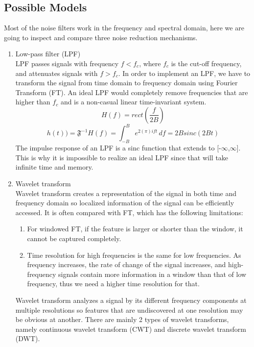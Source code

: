 \subsection{Possible Models}
Most of the noise filters work in the frequency and spectral domain, here we are going to inspect and
compare three noise reduction mechanisms.

\begin{enumerate}[label=\textbf{\arabic*})]
    \item Low-pass filter (LPF)\\
    LPF passes signals with frequency \(f<f_{c}\), where \(f_{c}\) is the cut-off frequency, and attenuates
    signals with \(f>f_{c}\). 
    In order to implement an LPF, we have to transform the signal from time domain to 
    frequency domain using Fourier Transform (FT). An ideal LPF would completely remove frequencies that are
    higher than \(f_{c}\) and is a non-casual linear time-invariant system. 
    \[H(f) = rect(\frac{f}{2B})\]
    \[h(t))= \mathfrak{F}^{-1}{H(f)} = \int_{-B}^{B} e^{2(\pi)ift}\,df = 2Bsinc(2Bt)\]
    The impulse response of an LPF is a sinc function that extends to [-$\infty$,$\infty$]. This is why it is 
    impossible to realize an ideal LPF since that will take infinite time and memory.

    \item Wavelet transform\\
    Wavelet transform creates a representation of the signal in both time and frequency domain so localized 
    information of the signal can be efficiently accessed. It is often compared with FT, which
    has the following limitations: 
    \begin{enumerate}
        \item For windowed FT, if the feature is larger or shorter than the window, it cannot be captured completely.
        \item Time resolution for high frequencies is the same for low frequencies. As frequency increases, the rate of 
        change of the signal increases, and high-frequency signals contain more information in a window than that of 
        low frequency, thus we need a higher time resolution for that.
    \end{enumerate}
    Wavelet transform analyzes a signal by its different frequency components at multiple resolutions so features that are 
    undiscovered at one resolution may be obvious at another. There are mainly 2 types of wavelet transforms, namely 
    continuous wavelet transform (CWT) and discrete wavelet transform (DWT).
    

\end{enumerate}
